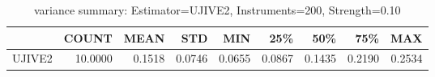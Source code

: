 \begin{table}[ht]
\centering
\caption{variance summary: Estimator=UJIVE2, Instruments=200, Strength=0.10}
\begin{tabular}{lrrrrrrrr}
\toprule
 & COUNT & MEAN & STD & MIN & 25\% & 50\% & 75\% & MAX \\
\midrule
UJIVE2 & 10.0000 & 0.1518 & 0.0746 & 0.0655 & 0.0867 & 0.1435 & 0.2190 & 0.2534 \\
\bottomrule
\end{tabular}
\end{table}
